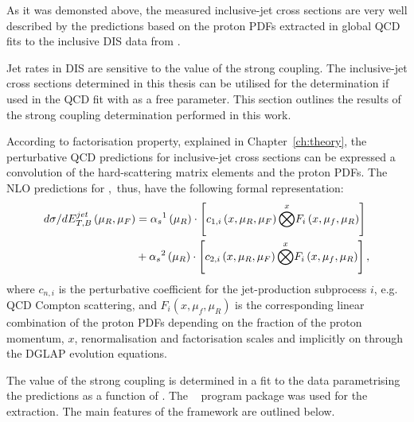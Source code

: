 As it was demonsted above, the measured inclusive-jet cross sections are very well described by the predictions based on the proton PDFs extracted in global QCD fits to the inclusive DIS data from \hera. 

Jet rates in DIS are sensitive to the value of the strong coupling. The inclusive-jet cross sections determined in this thesis can be utilised for the \as determination if used in the QCD fit with \as as a free parameter. This section outlines the results of the strong coupling determination performed in this work.

According to factorisation property, explained in Chapter~\ref{ch:theory}, the perturbative QCD predictions for inclusive-jet cross sections can be expressed a convolution of the hard-scattering matrix elements and the proton PDFs. The NLO predictions for \dsdetjetb,~thus, have the following formal representation:
\begin{equation}
	\begin{split}
\mbox{$d\sigma/dE_{T,B}^{jet}$}\left( \mu_R, \mu_F\right) &= \mbox{$\alpha_{s}$}^1\left( \mu_R\right) \cdot \left[ c_{1,i}\left( x, \mu_R, \mu_F\right) \overset{x}{\bigotimes } F_i\left( x, \mu_f, \mu_R \right) \right] \\
&+ \mbox{$\alpha_{s}$}^2\left( \mu_R\right) \cdot \left[ c_{2,i}\left( x, \mu_R, \mu_F\right) \overset{x}{\bigotimes } F_i\left( x, \mu_f, \mu_R \right) \right],
	\end{split}
\end{equation}
where $c_{n,i}$ is the perturbative coefficient for the jet-production subprocess $i$, e.g. QCD Compton scattering, and $F_i\left( x, \mu_f, \mu_R \right)$ is the corresponding linear combination of the proton PDFs depending on the fraction of the proton momentum, $x$, renormalisation and factorisation scales and implicitly on \as through the DGLAP evolution equations.

The value of the strong coupling is determined in a fit to the data parametrising the predictions as a function of \as. The \herafitter~\cite{Aaron:2009aa,Aaron:2009kv} program package was used for the \as extraction. The main features of the \herafitter framework are outlined below.

